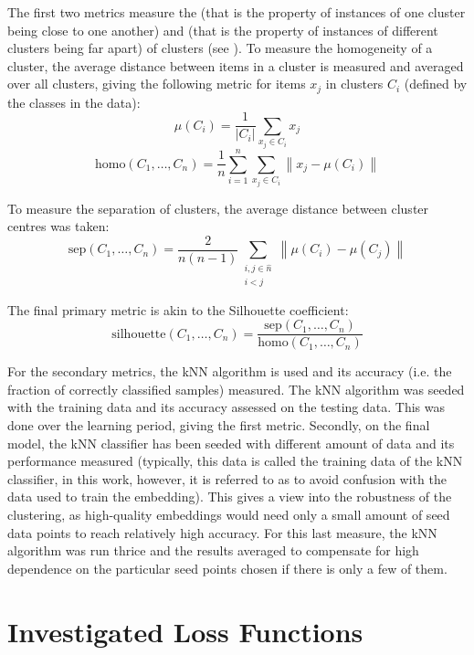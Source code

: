 The first two metrics measure the  (that is the property of instances of one cluster being close to one another) and  (that is the property of instances of different clusters being far apart) of clusters (see \cite{everitt_cluster_2001}). To measure the homogeneity of a cluster, the average distance between items in a cluster is measured and averaged over all clusters, giving the following metric for items \( x_j \) in clusters \( C_i \) (defined by the classes in the data):
\[ \mu \left( C_i \right) = \frac{1}{\left\lvert C_i \right\rvert} \sum_{x_j \in C_i} x_j \]
\[ \mathrm{homo} \left( C_1, \dots, C_n \right) = \frac{1}{n} \sum_{i = 1}^n \sum_{x_j \in C_i} \left\lVert x_j - \mu \left( C_i \right) \right\rVert \]

To measure the separation of clusters, the average distance between cluster centres was taken:
\[ \mathrm{sep} \left( C_1, \dots, C_n \right) = \frac{2}{n \left( n - 1 \right)} \sum_{\substack{i, j \in \hat{n} \\ i < j }} \left\lVert \mu \left( C_i \right) - \mu \left( C_j \right) \right\rVert \]

The final primary metric is akin to the Silhouette coefficient:
\[ \mathrm{silhouette} \left( C_1, \dots, C_n \right) = \frac{\mathrm{sep} \left( C_1, \dots, C_n \right)}{\mathrm{homo} \left( C_1, \dots, C_n \right)} \]

For the secondary metrics, the kNN algorithm is used and its accuracy (i.e. the fraction of correctly classified samples) measured. The kNN algorithm was seeded with the training data and its accuracy assessed on the testing data. This was done over the learning period, giving the first metric. Secondly, on the final model, the kNN classifier has been seeded with different amount of data and its performance measured (typically, this data is called the training data of the kNN classifier, in this work, however, it is referred to as  to avoid confusion with the data used to train the embedding). This gives a view into the robustness of the clustering, as high-quality embeddings would need only a small amount of seed data points to reach relatively high accuracy. For this last measure, the kNN algorithm was run thrice and the results averaged to compensate for high dependence on the particular seed points chosen if there is only a few of them.

\section{Investigated Loss Functions}\label{sec:loss-functions}

